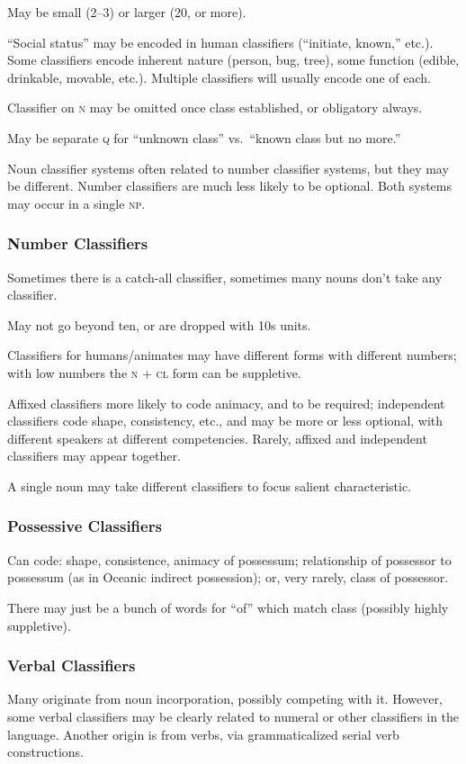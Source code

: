 \documentclass[11pt]{article}
\newcommand{\I}[1]{\textsc{#1}}   %
\begin{document}
May be small (2--3) or larger (20, or more).

``Social status'' may be encoded in human classifiers (``initiate,
known,'' etc.).  Some classifiers encode inherent nature (person, bug,
tree), some function (edible, drinkable, movable, etc.).  Multiple
classifiers will usually encode one of each.

Classifier on \I{n} may be omitted once class established, or
obligatory always.

May be separate \I{q} for ``unknown class'' vs.\ ``known class but no
more.'' 

Noun classifier systems often related to number classifier systems,
but they may be different.  Number classifiers are much less likely to
be optional.  Both systems may occur in a single \I{np}.

\subsubsection{Number Classifiers}
Sometimes there is a catch-all classifier, sometimes many nouns don't
take any classifier.

May not go beyond ten, or are dropped with 10s units.

Classifiers for humans/animates may have different forms with
different numbers; with low numbers the \I{n + cl} form can be
suppletive.

Affixed classifiers more likely to code animacy, and to be required;
independent classifiers code shape, consistency, etc., and may be more
or less optional, with different speakers at different competencies.
Rarely, affixed and independent classifiers may appear together.

A single noun may take different classifiers to focus salient
characteristic.

\subsubsection{Possessive Classifiers}
Can code: shape, consistence, animacy of possessum; relationship of
possessor to possessum (as in Oceanic indirect possession); or, very
rarely, class of possessor.

There may just be a bunch of words for ``of'' which match class
(possibly highly suppletive).

\subsubsection{Verbal Classifiers} 
Many originate from noun incorporation, possibly competing with it.
However, some verbal classifiers may be clearly related to numeral or
other classifiers in the language.  Another origin is from verbs, via
grammaticalized serial verb constructions.
\end{document}
